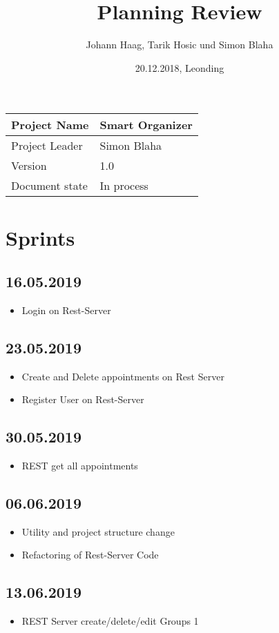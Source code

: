 \documentclass[12pt]{scrartcl}
\title{Planning Review}
\author{Johann Haag, Tarik Hosic und Simon Blaha}
\date{20.12.2018, Leonding}
\begin{document}
    \maketitle
    \begin{flushleft}
    \begin{tabular}{|l|l|}
    \hline
    Project Name & Smart Organizer \\ \hline
    Project Leader & Simon Blaha \\ \hline
    Version & 1.0\\ \hline
    Document state & In process \\ \hline
    \end{tabular}
    \end{flushleft}

    \pagebreak
    \tableofcontents
    \pagebreak

    \section{Sprints}
    \subsection{16.05.2019}
    \begin{itemize}
        \item Login on Rest-Server
    \end{itemize}

    \subsection{23.05.2019}
    \begin{itemize}
        \item Create and Delete appointments on Rest Server
        \item Register User on Rest-Server
    \end{itemize}

    \subsection{30.05.2019}
    \begin{itemize}
        \item REST get all appointments
    \end{itemize}

    \subsection{06.06.2019}
    \begin{itemize}
        \item Utility and project structure change
        \item Refactoring of Rest-Server Code
    \end{itemize}

    \subsection{13.06.2019}
    \begin{itemize}
        \item REST Server create/delete/edit Groups 1
    \end{itemize}

\end{document}
